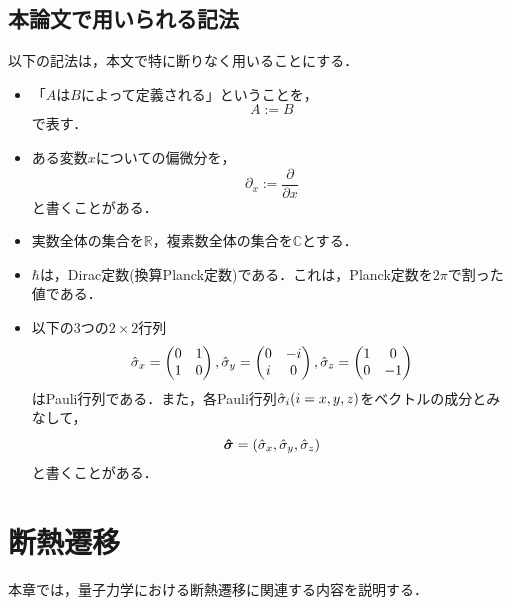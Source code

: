 \documentclass[a4paper, titlepage]{jsreport}
\begin{document}
\section{本論文で用いられる記法}
以下の記法は，本文で特に断りなく用いることにする．\\
\begin{itemize} 
  \item
    「$A$は$B$によって定義される」ということを，
    \begin{equation}
      A := B
    \end{equation}
    で表す．
  \item
    ある変数$x$についての偏微分を，
    \begin{equation}
      \partial_x := \frac{\partial}{\partial x}
    \end{equation}
    と書くことがある．
  \item 実数全体の集合を$\mathbb{R}$，複素数全体の集合を$\mathbb{C}$とする．
  \item $\hbar$は，Dirac定数(換算Planck定数)である．これは，Planck定数を$2\pi$で割った値である．
  \item 以下の3つの$2\times2$行列
\begin{equation}
  \Hat{\sigma}_x=
  \begin{pmatrix}
    0 & 1\\
    1 & 0\\
  \end{pmatrix}
  ,
  \Hat{\sigma}_y=
  \begin{pmatrix}
    0 & -i\\
    i & 0\\
  \end{pmatrix}
  ,
  \Hat{\sigma}_z=
  \begin{pmatrix}
    1 & 0\\
    0 & -1\\
  \end{pmatrix}
\end{equation}
はPauli行列である．また，各Pauli行列$\Hat{\sigma}_i (i = x,y,z)$をベクトルの成分とみなして，
\begin{equation}
  \bm{\Hat{\sigma}} = (\Hat{\sigma}_x, \Hat{\sigma}_y, \Hat{\sigma}_z)
\end{equation}
と書くことがある．
\end{itemize}

\chapter{断熱遷移} \label{AT}
本章では，量子力学における断熱遷移に関連する内容を説明する．
\end{document}
